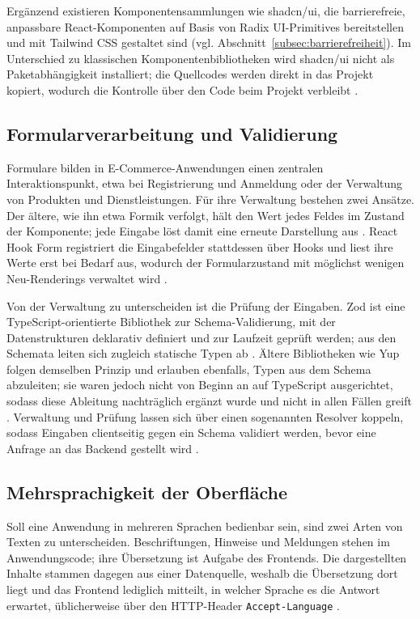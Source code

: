 Ergänzend existieren Komponentensammlungen wie shadcn/ui, die
barrierefreie, anpassbare React-Komponenten auf Basis von Radix
UI-Primitives bereitstellen und mit Tailwind CSS gestaltet sind
(vgl. Abschnitt~\ref{subsec:barrierefreiheit}). Im Unterschied zu
klassischen Komponentenbibliotheken wird shadcn/ui nicht als
Paketabhängigkeit installiert; die Quellcodes werden direkt in das
Projekt kopiert, wodurch die Kontrolle über den Code beim Projekt
verbleibt \cite{shadcn_docs}.


\subsection{Formularverarbeitung und Validierung}
\label{subsec:formulare-validierung}

Formulare bilden in E-Commerce-Anwendungen einen zentralen
Interaktionspunkt, etwa bei Registrierung und Anmeldung oder der
Verwaltung von Produkten und Dienstleistungen. Für ihre Verwaltung
bestehen zwei Ansätze. Der ältere, wie ihn etwa Formik verfolgt, hält
den Wert jedes Feldes im Zustand der Komponente; jede Eingabe löst
damit eine erneute Darstellung aus \cite{formik_docs}. React Hook Form
registriert die Eingabefelder stattdessen über Hooks und liest ihre
Werte erst bei Bedarf aus, wodurch der Formularzustand mit möglichst
wenigen Neu-Renderings verwaltet wird \cite{react_hook_form_docs}.

Von der Verwaltung zu unterscheiden ist die Prüfung der Eingaben. Zod
ist eine TypeScript-orientierte Bibliothek zur Schema-Validierung, mit
der Datenstrukturen deklarativ definiert und zur Laufzeit geprüft
werden; aus den Schemata leiten sich zugleich statische Typen ab
\cite{zod_docs}. Ältere Bibliotheken wie Yup folgen demselben Prinzip
und erlauben ebenfalls, Typen aus dem Schema abzuleiten; sie waren
jedoch nicht von Beginn an auf TypeScript ausgerichtet, sodass diese
Ableitung nachträglich ergänzt wurde und nicht in allen Fällen greift
\cite{yup_docs}. Verwaltung und Prüfung lassen sich über einen
sogenannten Resolver koppeln, sodass Eingaben clientseitig gegen ein
Schema validiert werden, bevor eine Anfrage an das Backend gestellt
wird \cite{react_hook_form_docs}.

\subsection{Mehrsprachigkeit der Oberfläche}
\label{subsec:mehrsprachigkeit}
 
Soll eine Anwendung in mehreren Sprachen bedienbar sein, sind zwei
Arten von Texten zu unterscheiden. Beschriftungen, Hinweise und
Meldungen stehen im Anwendungscode; ihre Übersetzung ist Aufgabe des
Frontends. Die dargestellten Inhalte stammen dagegen aus einer
Datenquelle, weshalb die Übersetzung dort liegt und das Frontend
lediglich mitteilt, in welcher Sprache es die Antwort erwartet,
üblicherweise über den \acs{HTTP}-Header \texttt{Accept-Language}
\cite{rfc9110}.

